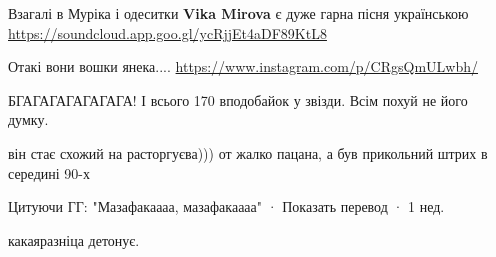 \begin{itemize}
 
Взагалі в Муріка і одеситки \textbf{Vika Mirova} є дуже гарна пісня українською
\url{https://soundcloud.app.goo.gl/ycRjjEt4aDF89KtL8}

 
Отакі вони вошки янека....
\url{https://www.instagram.com/p/CRgsQmULwbh/}

\begin{itemize}
 
БГАГАГАГАГАГАГА! І всього 170 вподобайок у звізди. Всім похуй не його думку.

 
він стає схожий на расторгуєва))) от жалко пацана, а був прикольний штрих в середині 90-х
\end{itemize}

 
Цитуючи ГГ: "Мазафакаааа, мазафакаааа"
 · Показать перевод · 1 нед.
 
какаяразніца детонує.

 

\end{itemize}

